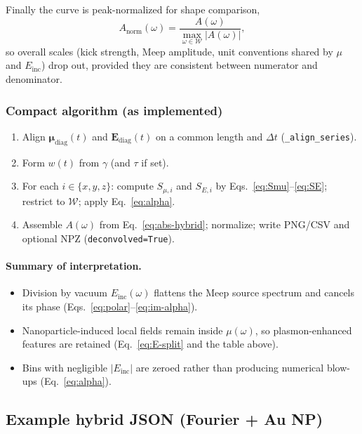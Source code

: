 \documentclass[11pt,a4paper]{article}
\begin{document}
Finally the curve is peak-normalized for shape comparison,
\begin{equation}
  A_{\mathrm{norm}}(\omega)
  =
  \frac{A(\omega)}{\max_{\omega\in\mathcal{W}} |A(\omega)|},
\end{equation}
so overall scales (kick strength, Meep amplitude, unit conventions
shared by $\mu$ and $E_{\mathrm{inc}}$) drop out, provided they are
consistent between numerator and denominator.

\subsubsection{Compact algorithm (as implemented)}

\begin{enumerate}
  \item Align $\boldsymbol{\mu}_{\mathrm{diag}}(t)$ and
        $\mathbf{E}_{\mathrm{diag}}(t)$ on a common length and $\Delta t$
        (\texttt{\_align\_series}).
  \item Form $w(t)$ from $\gamma$ (and $\tau$ if set).
  \item For each $i\in\{x,y,z\}$:
        compute $S_{\mu,i}$ and $S_{E,i}$ by Eqs.~\eqref{eq:Smu}--\eqref{eq:SE};
        restrict to $\mathcal{W}$; apply Eq.~\eqref{eq:alpha}.
  \item Assemble $A(\omega)$ from Eq.~\eqref{eq:abs-hybrid}; normalize;
        write PNG/CSV and optional NPZ (\texttt{deconvolved=True}).
\end{enumerate}

\paragraph{Summary of interpretation.}
\begin{itemize}
  \item Division by vacuum $E_{\mathrm{inc}}(\omega)$ flattens the Meep
        source spectrum and cancels its phase
        (Eqs.~\eqref{eq:polar}--\eqref{eq:im-alpha}).
  \item Nanoparticle-induced local fields remain inside $\mu(\omega)$, so
        plasmon-enhanced features are retained
        (Eq.~\eqref{eq:E-split} and the table above).
  \item Bins with negligible $|E_{\mathrm{inc}}|$ are zeroed rather than
        producing numerical blow-ups (Eq.~\eqref{eq:alpha}).
\end{itemize}

\subsection{Example hybrid JSON (Fourier + Au NP)}
\end{document}
